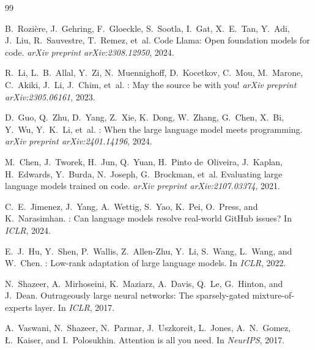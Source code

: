 \documentclass[11pt,a4paper]{article}
\begin{document}
\begin{thebibliography}{99}

B.~Rozi\`ere, J.~Gehring, F.~Gloeckle, S.~Sootla, I.~Gat, X.~E.~Tan,
Y.~Adi, J.~Liu, R.~Sauvestre, T.~Remez, et~al.
\newblock Code {Llama}: Open foundation models for code.
\newblock \emph{arXiv preprint arXiv:2308.12950}, 2024.

R.~Li, L.~B.~Allal, Y.~Zi, N.~Muennighoff, D.~Kocetkov, C.~Mou,
M.~Marone, C.~Akiki, J.~Li, J.~Chim, et~al.
: May the source be with you!
\newblock \emph{arXiv preprint arXiv:2305.06161}, 2023.

D.~Guo, Q.~Zhu, D.~Yang, Z.~Xie, K.~Dong, W.~Zhang, G.~Chen, X.~Bi,
Y.~Wu, Y.~K.~Li, et~al.
: When the large language model meets programming.
\newblock \emph{arXiv preprint arXiv:2401.14196}, 2024.

M.~Chen, J.~Tworek, H.~Jun, Q.~Yuan, H.~Pinto de~Oliveira, J.~Kaplan,
H.~Edwards, Y.~Burda, N.~Joseph, G.~Brockman, et~al.
\newblock Evaluating large language models trained on code.
\newblock \emph{arXiv preprint arXiv:2107.03374}, 2021.

C.~E.~Jimenez, J.~Yang, A.~Wettig, S.~Yao, K.~Pei, O.~Press, and
K.~Narasimhan.
: Can language models resolve real-world {GitHub} issues?
\newblock In \emph{ICLR}, 2024.

E.~J.~Hu, Y.~Shen, P.~Wallis, Z.~Allen-Zhu, Y.~Li, S.~Wang, L.~Wang, and
W.~Chen.
: Low-rank adaptation of large language models.
\newblock In \emph{ICLR}, 2022.

N.~Shazeer, A.~Mirhoseini, K.~Maziarz, A.~Davis, Q.~Le, G.~Hinton, and
J.~Dean.
\newblock Outrageously large neural networks: The sparsely-gated
mixture-of-experts layer.
\newblock In \emph{ICLR}, 2017.

A.~Vaswani, N.~Shazeer, N.~Parmar, J.~Uszkoreit, L.~Jones, A.~N.~Gomez,
\L.~Kaiser, and I.~Polosukhin.
\newblock Attention is all you need.
\newblock In \emph{NeurIPS}, 2017.

\end{thebibliography}
\end{document}
